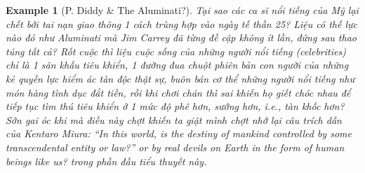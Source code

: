 \documentclass[12pt,oneside]{book}
\newtheorem{example}{Example}
\begin{document}
\begin{example}[P. Diddy \& The Aluminati?]
	Tại sao các ca sĩ nổi tiếng của Mỹ lại chết bởi tai nạn giao thông 1 cách trùng hợp vào ngày tế thần 25? Liệu có thế lực nào đó như Aluminati mà {\sc Jim Carrey} đã từng đề cập không ít lần, đứng sau thao túng tất cả? Rốt cuộc thì liệu cuộc sống của những người nổi tiếng (celebrities) chỉ là 1 sân khấu tiêu khiển, 1 đường đua chuột phiên bản con người của những kẻ quyền lực hiểm ác tàn độc thật sự, buôn bán cơ thể những người nổi tiếng như món hàng tình dục đắt tiền, rồi khi chơi chán thì sai khiến họ giết chóc nhau để tiếp tục tìm thú tiêu khiển ở 1 mức độ phê hơn, sướng hơn, i.e., tàn khốc hơn? Sởn gai óc khi mà điều này chợt khiến ta giật mình chợt nhớ lại câu trích dẫn của {\sc Kentaro Miura}: ``In this world, is the destiny of mankind controlled by some transcendental entity or law?'' or by real devils on Earth in the form of human beings like us? trong phần đầu tiểu thuyết này.
\end{example}
\end{document}
